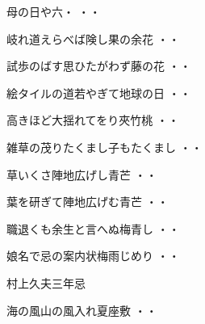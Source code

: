 \vspace{0.6cm}
\begin{shiika}母の日や六・
\hfill{・・}\end{shiika}
\vspace{0.6cm}
\begin{shiika}岐れ道えらべば険し果の余花
\hfill{・・}\end{shiika}
\vspace{0.6cm}
\begin{shiika}試歩のばす思ひたがわず藤の花
\hfill{・・}\end{shiika}
\vspace{0.6cm}
\begin{shiika}絵タイルの道若やぎて地球の日
\hfill{・・}\end{shiika}
\vspace{0.6cm}
\begin{shiika}高きほど大揺れてをり夾竹桃
\hfill{・・}\end{shiika}
\vspace{0.6cm}
\begin{shiika}雑草の茂りたくまし子もたくまし
\hfill{・・}\end{shiika}
\vspace{0.6cm}
\begin{shiika}草いくさ陣地広げし青芒
\hfill{・・}\end{shiika}
\vspace{0.6cm}
\begin{shiika}葉を研ぎて陣地広げむ青芒
\hfill{・・}\end{shiika}
\vspace{0.6cm}
\begin{shiika}職退くも余生と言へぬ梅青し
\hfill{・・}\end{shiika}
\vspace{0.6cm}
\begin{shiika}娘名で忌の案内状梅雨じめり
\hfill{・・}\end{shiika}
\vspace{0.6cm}
村上久夫三年忌
\begin{shiika}海の風山の風入れ夏座敷
\hfill{・・}\end{shiika}
